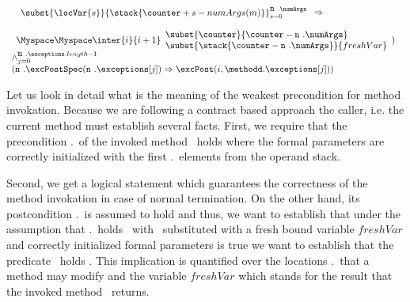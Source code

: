 \begin{itemize}
$$\begin{array}{l}
\begin{array}{l}
\begin{array}{l}
											\subst{ \locVar{s}}{\stack{\counter + s - numArgs(m)}}_{s = 0}^{ \mbox{\rm\texttt{n} }. \numArgs }                                                                                                	\end{array}  \Rightarrow \\ 
										      \\
										      \Myspace  \Myspace  \inter{i}{i+1 } \begin{array}{l}
										                                   \subst{\counter}{ \counter - \mbox{\rm\texttt{n} } .\numArgs}\\
														   \subst{ \stack{\counter -  \mbox{\rm\texttt{n} } .\numArgs  }}{ freshVar }																	\end{array}																									
	 				 			 )	\end{array}  \\
	 				 			\wedge_{j = 0 }^{\mbox{\rm\texttt{n} } .\exceptions.length -1} \\
                                                               (\mbox{\rm\texttt{n} }.\excPostSpec ( \mbox{\rm\texttt{n} }.\exceptions[j]) \Rightarrow 
                                                                    \excPost(i,   \methodd.\exceptions[j] )  ) \\		
	 				 			\end{array}
	 				 			$$ 
	 			

						Let us look in detail what is the meaning of the weakest precondition for method invokation.
						Because we are following a contract based approach 
						the caller, i.e. the current method must establish several facts.
						First, we require that 
						the precondition \methodd.\pre \ of the invoked method \methodd \ holds where the formal 
						parameters are correctly initialized with the
						first \methodd.\numArgs \ elements from the operand stack.
						
						Second, we get a logical statement which guarantees the correctness of the method invokation
						in case of normal termination.
						On the other hand, its postcondition  \methodd.\normalPost \ is assumed to hold and thus, we want to establish that 
						under the assumption that \methodd.\normalPost \  holds \ with \result \ substituted with a fresh bound variable $freshVar$
						and correctly initialized formal parameters
						is true we want to establish that the predicate    \
						holds . This implication is quantified over the locations  \method.\modif \ that a method may modify
						and the variable $freshVar$ which stands for the result that the invoked method \methodd \ returns.  
						

\end{itemize}
